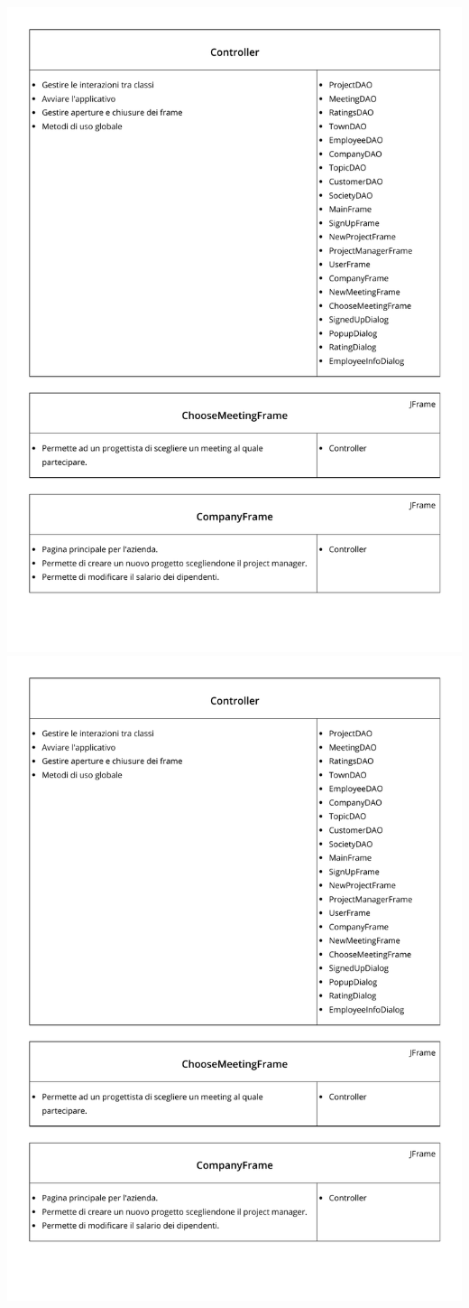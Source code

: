 \documentclass[a4paper,11pt]{report}
\begin{document}
			\includegraphics[page = 5, width = \textwidth]{IMGs/CRC.pdf}
			\newpage
			\includegraphics[page = 6, width = \textwidth]{IMGs/CRC.pdf}
\end{document}
